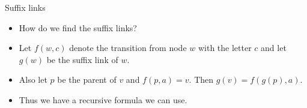\documentclass{beamer}
\begin{document}
\begin{frame}[plain]{Suffix links}
	\begin{itemize}
        \item How do we find the suffix links?
        \item Let $f(w, c)$ denote the transition from node $w$ with the letter $c$ and let $g(w)$ be the suffix link of $w$.
        \item Also let $p$ be the parent of $v$ and $f(p, a) = v$. Then $g(v) = f(g(p), a)$.
        \item Thus we have a recursive formula we can use.
    \end{itemize}
\end{frame}
\end{document}
